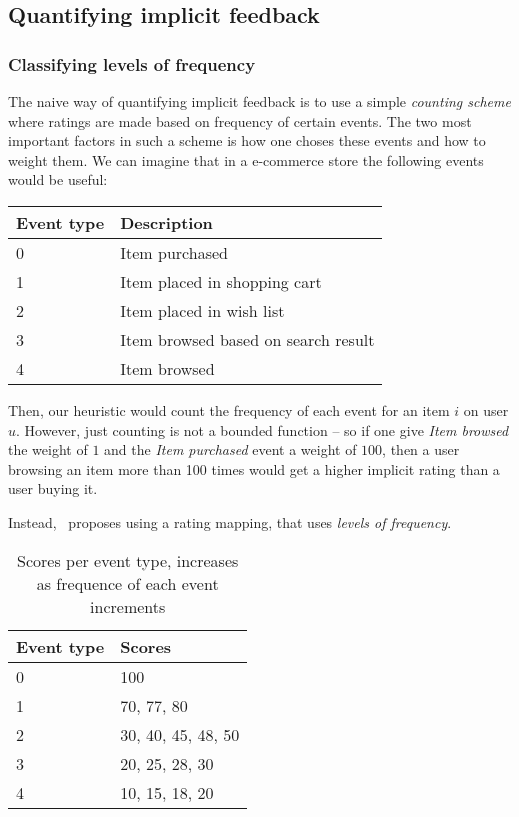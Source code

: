 \clearpage


\subsection{Quantifying implicit feedback}

\subsubsection{Classifying levels of frequency}

The naive way of quantifying implicit feedback is to use a simple
\textit{counting scheme} where ratings are made based on frequency of certain
events. The two most important factors in such a scheme is how one choses these
events and how to weight them. We can imagine that in a e-commerce store the
following events would be useful:

\begin{table}[H]
  \centering
  \begin{tabular}{ll}
  \toprule
  Event type & Description \\ \midrule
  0 & Item purchased \\
  1 & Item placed in shopping cart \\
  2 & Item placed in wish list \\
  3 & Item browsed based on search result \\
  4 & Item browsed \\
  \bottomrule
  \end{tabular}
\end{table}

Then, our heuristic would count the frequency of each event for an item $i$ on
user $u$. However, just counting is not a bounded function – so if one give
\textit{Item browsed} the weight of $1$ and the \textit{Item purchased} event
a weight of $100$, then a user browsing an item more than 100 times would get a
higher implicit rating than a user buying it.

Instead,~\cite{pkghost2014implicit} proposes using a rating mapping, that uses
\textit{levels of frequency}.

\begin{table}[H]
  \centering
  \begin{tabular}{ll}
  \toprule
  Event type & Scores \\ \midrule
  0 & 100 \\
  1 & 70, 77, 80 \\
  2 & 30, 40, 45, 48, 50 \\
  3 & 20, 25, 28, 30 \\
  4 & 10, 15, 18, 20 \\
  \bottomrule
  \end{tabular}
  \caption{Scores per event type, increases as frequence of each event
           increments}
\label{implicit-table}
\end{table}

